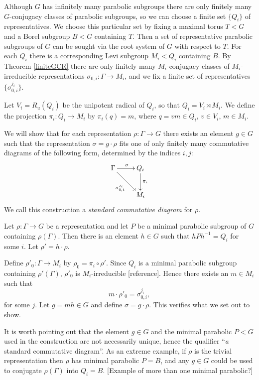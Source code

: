 Although $G$ has infinitely many parabolic subgroups there are only finitely many $G$-conjugacy classes of parabolic subgroups, so we can choose a finite set $\{Q_i\}$ of representatives. We choose this particular set by fixing a maximal torus $T<G$ and a Borel subgroup $B<G$ containing $T$. Then a set of representative parabolic subgroups of $G$ can be sought via the root system of $G$ with respect to $T$. For each $Q_i$ there is a corresponding Levi subgroup $M_i<Q_i$ containing $B$. By Theorem \ref{finiteGCR} there are only finitely many $M_i$-conjugacy classes of $M_i$-irreducible representations $\sigma_{0, i}:\Gamma\rightarrow M_i$, and we fix a finite set of representatives $\{\sigma^{j_i}_{0,i}\}$. 

Let $V_i = R_u(Q_i)$ be the unipotent radical of $Q_i$, so that $Q_i = V_i \rtimes M_i$. We define the projection $\pi_i:Q_i \rightarrow M_i$ by $\pi_i(q) = m$, where $q = vm \in Q_i$, $v\in V_i$, $m\in M_i$.

We will show that for each representation $\rho:\Gamma\rightarrow G$ there exists an element $g\in G$ such that the representation $\sigma = g\cdot\rho$ fits one of only finitely many commutative diagrams of the following form, determined by the indices $i,j$:
\begin{displaymath}
	\xymatrix{
	\Gamma \ar[r]^{\sigma} \ar[rd]_{\sigma^{j_i}_{0,i}} & Q_i \ar[d]^{\pi_i}\\
	& M_i}
\end{displaymath}
We call this construction a \emph{standard commutative diagram} for $\rho$.

Let $\rho:\Gamma\rightarrow G$ be a representation and let $P$ be a minimal parabolic subgroup of $G$ containing $\rho(\Gamma)$. Then there is an element $h\in G$ such that $hPh^{-1} = Q_i$ for some $i$. Let $\rho' = h\cdot \rho$. 

Define $\rho'_0:\Gamma\rightarrow M_i$ by $\rho_0 = \pi_i \circ \rho'$. Since $Q_i$ is a minimal parabolic subgroup containing $\rho'(\Gamma)$, $\rho'_0$ is $M_i$-irreducible [reference]. Hence there exists an $m\in M_i$ such that
\begin{displaymath}
	m\cdot \rho'_0 = \sigma^{j_i}_{0,i}, 
\end{displaymath}
for some $j$. Let $g=mh\in G$ and define $\sigma = g\cdot \rho$. This verifies what we set out to show.

It is worth pointing out that the element $g\in G$ and the minimal parabolic $P<G$ used in the construction are not necessarily unique, hence the qualifier ``\emph{a} standard commutative diagram''. As an extreme example, if $\rho$ is the trivial representation then $\rho$ has minimal parabolic $P=B$, and any $g\in G$ could be used to conjugate $\rho(\Gamma)$ into $Q_i=B$. [Example of more than one minimal parabolic?]

